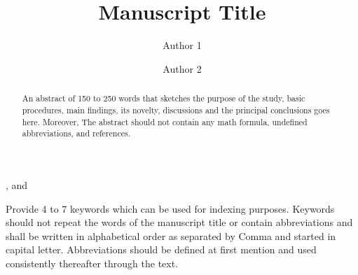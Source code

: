 \documentclass[Print]{../Style/isecure-v24}
\begin{document}
\begin{frontmatter}


\def\NoDingTitle{Manuscript Title}
\title{\NoDingTitle\textsuperscript{ }}


\author[a1,CorAuth]{Author 1}, and%
\author[a2]{Author 2}


\address[a1]{Author1 affiliation}
\address[a2]{Author2 affiliation}




\begin{abstract}
An abstract of 150 to 250 words that sketches the purpose of the study, basic procedures, main findings, its novelty, discussions and the principal conclusions goes here. Moreover, The abstract should not contain any math formula, undefined abbreviations, and references.
\lipsum[2]
\end{abstract}

\begin{keyword}
Provide 4 to 7 keywords which can be used for indexing purposes. Keywords should not repeat the words of the manuscript title or contain abbreviations and shall be written in alphabetical order as separated by Comma and started in capital letter. Abbreviations should be defined at first mention and used consistently thereafter through the text.

\end{keyword}


\makeatother

\end{frontmatter}
\end{document}

